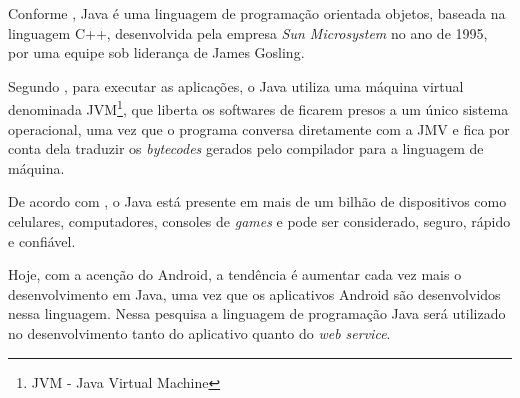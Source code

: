 
	\par Conforme , Java é uma linguagem de programação
orientada objetos, baseada na linguagem C++, desenvolvida pela empresa
\textit{Sun Microsystem} no ano de {1995}, por uma equipe sob liderança de James
Gosling.

	\par Segundo , para executar as aplicações, o
Java utiliza uma máquina virtual denominada JVM\footnote{JVM - Java
Virtual Machine}, que liberta os softwares de ficarem presos a um único sistema
operacional, uma vez que o programa conversa diretamente com a JMV e fica por
conta dela traduzir os \textit{bytecodes} gerados pelo compilador para a
linguagem de máquina.

	\par De acordo com , o Java está presente em mais de
um bilhão de dispositivos como celulares, computadores, consoles de
\textit{games} e pode ser considerado, seguro, rápido e confiável.

	\par Hoje, com a acenção do Android, a tendência é aumentar cada vez mais o
desenvolvimento em Java, uma vez que os aplicativos Android são desenvolvidos
nessa linguagem. Nessa pesquisa a linguagem de programação Java será utilizado
no desenvolvimento tanto do aplicativo quanto do \textit{web service}.
